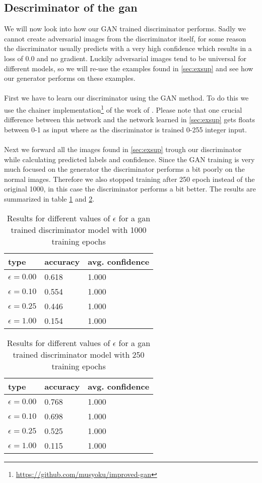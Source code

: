 \documentclass[a4paper]{article}
\begin{document}
\subsection{Descriminator of the gan}
We will now look into how our GAN trained discriminator performs. Sadly we cannot create adversarial images from the discriminator itself, for some reason the discriminator usually predicts with a very high confidence which results in a loss of 0.0 and no gradient. Luckily adversarial images tend to be universal for different models, so we will re-use the examples found in \ref{sec:exsup} and see how our generator performs on these examples.\\ \\
First we have to learn our discriminator using the GAN method. To do this we use the chainer implementation\footnote{\url{https://github.com/musyoku/improved-gan}} of the work of . Please note that one crucial difference between this network and the network learned in \ref{sec:exsup} gets floats between 0-1 as input where as the discriminator is trained 0-255 integer input.  \\ \\
Next we forward all the images found in \ref{sec:exsup} trough our discriminator while calculating  predicted labels and confidence. Since the GAN training is very much focused on the generator the discriminator performs a bit poorly on the normal images. Therefore we also stopped training after 250 epoch instead of the original 1000, in this case the discriminator performs a bit better.  The results are summarized in table \ref{table:advgan1} and \ref{table:advgan2}. 
\begin{table}[H]
\centering
\begin{tabular}{|l|l|l|}\hline
\textbf{type} & \textbf{accuracy} & \textbf{avg. confidence}\\\hline
$\epsilon = 0.00$ & 0.618 & 1.000\\\hline
$\epsilon = 0.10$ & 0.554 & 1.000\\\hline
$\epsilon = 0.25$ & 0.446 & 1.000\\\hline
$\epsilon = 1.00$ & 0.154 & 1.000\\\hline
\end{tabular}
\caption{Results for different values of $\epsilon$ for a gan trained discriminator model with 1000 training epochs }
\label{table:advgan1}
\end{table}
\begin{table}[H]
\centering
\begin{tabular}{|l|l|l|}\hline
\textbf{type} & \textbf{accuracy} & \textbf{avg. confidence}\\\hline
$\epsilon = 0.00$ & 0.768 & 1.000\\\hline
$\epsilon = 0.10$ & 0.698 & 1.000\\\hline
$\epsilon = 0.25$ & 0.525 & 1.000\\\hline
$\epsilon = 1.00$ & 0.115 & 1.000\\\hline
\end{tabular}
\caption{Results for different values of $\epsilon$ for a gan trained  discriminator model with 250 training epochs }
\label{table:advgan2}
\end{table}
\end{document}
